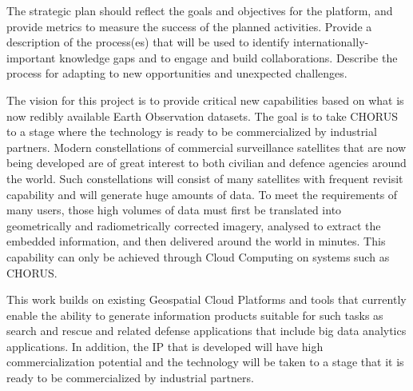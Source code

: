 The strategic plan should reflect the goals and objectives for the platform, and provide metrics to measure the success of the planned activities. Provide a description of the process(es) that will be used to identify internationally-important knowledge gaps and to engage and build collaborations. Describe the process for adapting to new opportunities and unexpected challenges.

The vision for this project is to provide critical new capabilities based on what is now redibly available Earth Observation datasets.  The goal is to take CHORUS to a stage where the technology is ready to be commercialized by industrial partners. Modern constellations of commercial surveillance satellites that are now being developed are of great interest to both civilian and defence agencies around the world.  Such constellations will consist of many satellites with frequent revisit capability and will generate huge amounts of data.  To meet the requirements of many users, those high volumes of data must first be translated into geometrically and radiometrically corrected imagery, analysed to extract the embedded information, and then delivered around the world in minutes.  This capability can only be achieved through Cloud Computing on systems such as CHORUS.

This work builds on existing Geospatial Cloud Platforms and tools that currently enable the ability to generate information products suitable for such tasks as search and rescue and related defense applications that include big data analytics applications.   In addition, the IP that is developed will have high commercialization potential and the technology will be taken to a stage that it is ready to be commercialized by industrial partners. 


